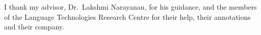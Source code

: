 I thank my advisor, Dr.\ Lakshmi Narayanan, for his guidance, and the members of the Language
Technologies Research Centre for their help, their annotations and their company.

